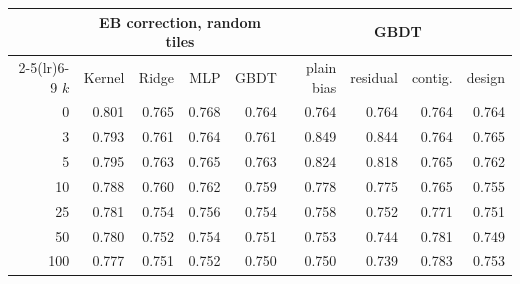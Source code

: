 \begin{tabular}{rrrrrrrrr}
\toprule
& \multicolumn{4}{c}{EB correction, random tiles} & \multicolumn{4}{c}{GBDT} \\
\cmidrule(lr){2-5}\cmidrule(lr){6-9}
$k$ & Kernel & Ridge & MLP & GBDT & plain bias & residual & contig. & design \\
\midrule
0 & 0.801 & 0.765 & 0.768 & 0.764 & 0.764 & 0.764 & 0.764 & 0.764 \\
3 & 0.793 & 0.761 & 0.764 & 0.761 & 0.849 & 0.844 & 0.764 & 0.765 \\
5 & 0.795 & 0.763 & 0.765 & 0.763 & 0.824 & 0.818 & 0.765 & 0.762 \\
10 & 0.788 & 0.760 & 0.762 & 0.759 & 0.778 & 0.775 & 0.765 & 0.755 \\
25 & 0.781 & 0.754 & 0.756 & 0.754 & 0.758 & 0.752 & 0.771 & 0.751 \\
50 & 0.780 & 0.752 & 0.754 & 0.751 & 0.753 & 0.744 & 0.781 & 0.749 \\
100 & 0.777 & 0.751 & 0.752 & 0.750 & 0.750 & 0.739 & 0.783 & 0.753 \\
\bottomrule
\end{tabular}
